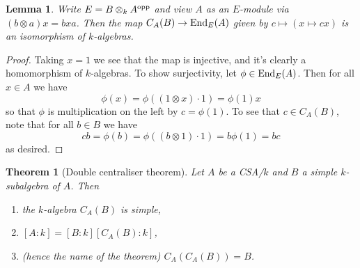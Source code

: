 \documentclass[11pt]{amsart}
\numberwithin{equation}{section}
\newtheorem{theorem}[equation]{Theorem}
\newtheorem{lemma}[equation]{Lemma}
\theoremstyle{remark}
\theoremstyle{remark}
\theoremstyle{remark}
\theoremstyle{definition}
\theoremstyle{definition}
\theoremstyle{definition}
\theoremstyle{definition}
\theoremstyle{definition}
\theoremstyle{definition}
\begin{document}
\begin{lemma} \label{cent as ends}
Write $E=B\otimes_k A^\textup{opp}$ and view $A$ as an $E$-module via $(b\otimes a)x=bxa$. Then the map $C_A(B)\rightarrow \textup{End}_E(A)$ given by $c\mapsto (x\mapsto cx)$ is an isomorphism of $k$-algebras.
\end{lemma}

\begin{proof}
Taking $x=1$ we see that the map is injective, and it's clearly a homomorphism of $k$-algebras. To show surjectivity, let $\phi \in \textup{End}_E(A)$. Then for all $x\in A$ we have 
\[\phi(x)=\phi((1\otimes x)\cdot 1)=\phi(1)x\]
so that $\phi$ is multiplication on the left by $c=\phi(1)$. To see that $c\in C_A(B)$, note that for all $b\in B$ we have
\[cb=\phi(b)=\phi((b\otimes 1)\cdot 1)=b\phi(1)=bc\]
as desired.
\end{proof}

\begin{theorem}[Double centraliser theorem]
Let $A$ be a CSA/$k$ and $B$ a simple $k$-subalgebra of $A$. Then
\begin{enumerate}
\item the $k$-algebra $C_A(B)$ is simple,
\item  $[A:k]=[B:k][C_A(B):k]$,
\item (hence the name of the theorem) $C_A(C_A(B))=B$.
\end{enumerate}
\end{theorem}
\end{document}
